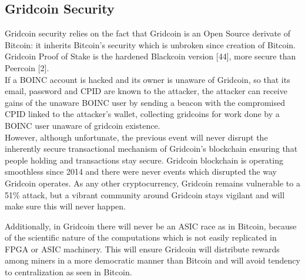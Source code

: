 \subsection{Gridcoin Security}

Gridcoin security relies on the fact that Gridcoin is an Open Source derivate of Bitcoin: it inherits Bitcoin's security which is unbroken since creation of Bitcoin. Gridcoin Proof of Stake is the hardened Blackcoin version [44], more secure than Peercoin [2].\\ 

If a BOINC account is hacked and its owner is unaware of Gridcoin, so that its email, password and CPID are known to the attacker, the attacker can receive gains of the unaware BOINC user by sending a beacon with the compromised CPID linked to the attacker's wallet, collecting gridcoins for work done by a BOINC user unaware of gridcoin existence.\\

However, although unfortunate, the previous event will never disrupt the inherently secure transactional mechanism of Gridcoin's blockchain ensuring that people holding and transactions stay secure. Gridcoin blockchain is operating smoothless since 2014 and there were never events which disrupted the way Gridcoin operates. As any other cryptocurrency, Gridcoin remains vulnerable to a 51\% attack, but a vibrant community around Gridcoin stays vigilant and will make sure this will never happen.

Additionally, in Gridcoin there will never be an ASIC race as in Bitcoin, because of the scientific nature of the computations which is not easily replicated in FPGA or ASIC machinery. This will ensure Gridcoin will distribute rewards among miners in a more democratic manner than Bitcoin and will avoid tendency to centralization as seen in Bitcoin.